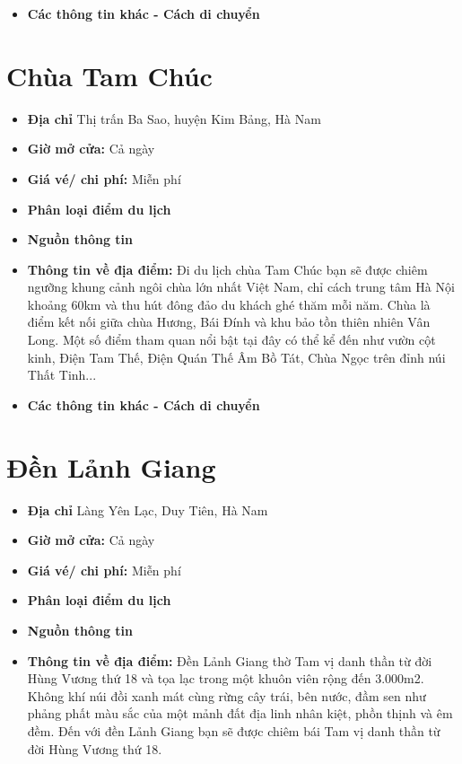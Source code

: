 \documentclass{article}
\begin{document}
\begin{itemize}
    \item{\textbf{Các thông tin khác - Cách di chuyển}} 
\end{itemize}

\section{Chùa Tam Chúc}
\begin{itemize}
    \item{\textbf{Địa chỉ}} Thị trấn Ba Sao, huyện Kim Bảng, Hà Nam

    \item{\textbf{Giờ mở cửa:}} Cả ngày

    \item{\textbf{Giá vé/ chi phí:}} Miễn phí

    \item{\textbf{Phân loại điểm du lịch}} 

    \item{\textbf{Nguồn thông tin}} 

    \item{\textbf{Thông tin về địa điểm:}} Đi du lịch chùa Tam Chúc bạn sẽ được chiêm ngưỡng khung cảnh ngôi chùa lớn nhất Việt Nam, chỉ cách trung tâm Hà Nội khoảng 60km và thu hút đông đảo du khách ghé thăm mỗi năm. Chùa là điểm kết nối giữa chùa Hương, Bái Đính và khu bảo tồn thiên nhiên Vân Long. Một số điểm tham quan nổi bật tại đây có thể kể đến như vườn cột kinh, Điện Tam Thế, Điện Quán Thế Âm Bồ Tát, Chùa Ngọc trên đỉnh núi Thất Tinh...
\end{itemize}

\begin{itemize}
    \item{\textbf{Các thông tin khác - Cách di chuyển}} 
\end{itemize}

\section{Đền Lảnh Giang}
\begin{itemize}
    \item{\textbf{Địa chỉ}} Làng Yên Lạc, Duy Tiên, Hà Nam

    \item{\textbf{Giờ mở cửa:}} Cả ngày

    \item{\textbf{Giá vé/ chi phí:}} Miễn phí

    \item{\textbf{Phân loại điểm du lịch}} 

    \item{\textbf{Nguồn thông tin}} 

    \item{\textbf{Thông tin về địa điểm:}} Đền Lảnh Giang thờ Tam vị danh thần từ đời Hùng Vương thứ 18 và tọa lạc trong một khuôn viên rộng đến 3.000m2. Không khí núi đồi xanh mát cùng rừng cây trái, bên nước, đầm sen như phảng phất màu sắc của một mảnh đất địa linh nhân kiệt, phồn thịnh và êm đềm. Đến với đền Lảnh Giang bạn sẽ được chiêm bái Tam vị danh thần từ đời Hùng Vương thứ 18.
\end{itemize}
\end{document}
